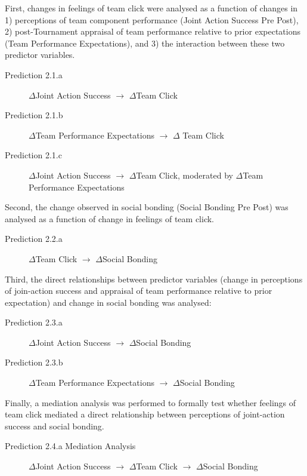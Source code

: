 \documentclass[12pt]{report}
\begin{document}
{First, changes in feelings of team click were analysed as a function of changes in 1) perceptions of team component performance (Joint Action Success Pre Post), 2) post-Tournament appraisal of team performance relative to prior expectations (Team Performance Expectations), and 3) the interaction between these two predictor variables.
\bigskip
\begin{description}
  \item [Prediction 2.1.a] $\Delta$Joint Action Success  $\rightarrow$  $\Delta$Team Click
  \item [Prediction 2.1.b] $\Delta$Team Performance Expectations $\rightarrow$ $\Delta$ Team Click
  \item [Prediction 2.1.c] $\Delta$Joint Action Success $\rightarrow$ $\Delta$Team Click, moderated by $\Delta$Team Performance Expectations
\end{description}

Second, the change observed in social bonding (Social Bonding Pre Post) was analysed as a function of change in feelings of team click.
\bigskip
\begin{description}
  \item [Prediction 2.2.a] $\Delta$Team Click $\rightarrow$ $\Delta$Social Bonding
\end{description}

Third, the direct relationships between predictor variables (change in perceptions of join-action success and appraisal of team performance relative to prior expectation) and change in social bonding was analysed:
\bigskip
\begin{description}
  \item [Prediction 2.3.a] $\Delta$Joint Action Success $\rightarrow$ $\Delta$Social Bonding
  \item [Prediction 2.3.b] $\Delta$Team Performance Expectations $\rightarrow$ $\Delta$Social Bonding
\end{description}

Finally, a mediation analysis was performed to formally test whether feelings of team click mediated a direct relationship between perceptions of joint-action success and social bonding.

\begin{description}
  \item[Prediction 2.4.a Mediation Analysis] $\Delta$Joint Action Success $\rightarrow$ $\Delta$Team Click $\rightarrow$ $\Delta$Social Bonding
\end{description}



}
\end{document}

